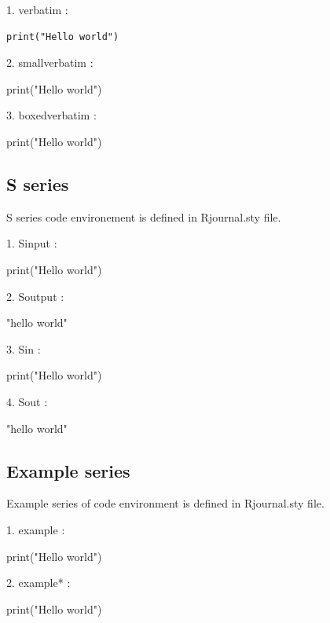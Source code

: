 1. verbatim :

\begin{verbatim}
print("Hello world")
\end{verbatim}


2. smallverbatim :

\begin{smallverbatim}
print("Hello world")
\end{smallverbatim}


3. boxedverbatim :

\begin{boxedverbatim}
print("Hello world")
\end{boxedverbatim}





\subsection{S series}

S series code environement is defined in Rjournal.sty file.

1. Sinput :

\begin{Sinput}
print("Hello world")
\end{Sinput}


2. Soutput :

\begin{Soutput}
[1] "hello world"
\end{Soutput}


3. Sin :

\begin{Sin}
print("Hello world")
\end{Sin}


4. Sout :
\begin{Sout}
[1] "hello world"
\end{Sout}


\subsection{Example series}
Example series of code environment is defined in Rjournal.sty file.

1. example :

\begin{example}
print("Hello world")
\end{example}


2. example* :

\begin{example*}
print("Hello world")
\end{example*}


